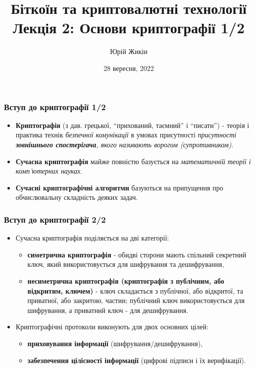 \documentclass{beamer}
\title{
  Біткоїн та криптовалютні технології \\
  Лекція 2: Основи криптографії 1/2
}
\author{Юрій Жикін}
\date{28 вересня, 2022}
\begin{document}
\frame{\titlepage}

\begin{frame}
  \frametitle{Вступ до криптографії 1/2}
  \begin{itemize}
  \item \textbf{Криптографія} (з дав. грецької, ``прихований, таємний'' і
    ``писати'') - теорія і практика технік \textit{безпечної комунікації} в
    умовах присутності \textit{присутності \textbf{зовнішнього спостерігача},
      якого називають ворогом (супротивником)}.
  \item \textbf{Сучасна криптографія} майже повністю базується на
    \textit{математичній теорії і комп'ютерних науках}.
  \item \textbf{Сучасні криптографічні алгоритми} базуються на припущення про
    обчислювальну складність деяких задач.
  \end{itemize}
\end{frame}

\begin{frame}
  \frametitle{Вступ до криптографії 2/2}
  \begin{itemize}
  \item Сучасна криптографія поділяється на дві категорії:
    \begin{itemize}
    \item \textbf{симетрична криптографія} - обидві сторони мають спільний
      секретний ключ, який використовується для шифрування та дешифрування,
    \item \textbf{несиметрична криптографія (криптографія з публічним, або
        відкритим, ключем)} - ключ складається з публічної, або відкритої, та
      приватної, або закритою, частин; публічний ключ використовується для
      шифрування, а приватний ключ - для дешифрування.
    \end{itemize}
  \item Криптографічні протоколи виконують для двох основних цілей:
    \begin{itemize}
    \item \textbf{приховування інформації} (шифрування/дешифрування),
    \item \textbf{забезпечення цілісності інформації} (цифрові підписи і їх
      верифікації).
    \end{itemize}
  \end{itemize}
\end{frame}
\end{document}
